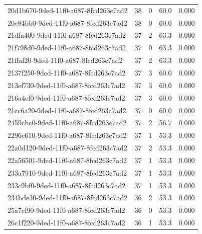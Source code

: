 \begin{longtable}{l r r r r}
20d1b670-9ded-11f0-a687-8fcd263c7ad2 & 38 & 0 & 60.0 & 0.000 \\

20e84bb0-9ded-11f0-a687-8fcd263c7ad2 & 38 & 0 & 60.0 & 0.000 \\

21dfa400-9ded-11f0-a687-8fcd263c7ad2 & 37 & 2 & 63.3 & 0.000 \\

21f798d0-9ded-11f0-a687-8fcd263c7ad2 & 37 & 0 & 63.3 & 0.000 \\

21ffaf20-9ded-11f0-a687-8fcd263c7ad2 & 37 & 2 & 63.3 & 0.000 \\

2137f250-9ded-11f0-a687-8fcd263c7ad2 & 37 & 3 & 60.0 & 0.000 \\

213ef730-9ded-11f0-a687-8fcd263c7ad2 & 37 & 3 & 60.0 & 0.000 \\

216a4cf0-9ded-11f0-a687-8fcd263c7ad2 & 37 & 3 & 60.0 & 0.000 \\

21cc6a20-9ded-11f0-a687-8fcd263c7ad2 & 37 & 0 & 60.0 & 0.000 \\

2459cbc0-9ded-11f0-a687-8fcd263c7ad2 & 37 & 2 & 56.7 & 0.000 \\

2296e610-9ded-11f0-a687-8fcd263c7ad2 & 37 & 1 & 53.3 & 0.000 \\

22a0d120-9ded-11f0-a687-8fcd263c7ad2 & 37 & 2 & 53.3 & 0.000 \\

22a56501-9ded-11f0-a687-8fcd263c7ad2 & 37 & 1 & 53.3 & 0.000 \\

233a7910-9ded-11f0-a687-8fcd263c7ad2 & 37 & 1 & 53.3 & 0.000 \\

233c9bf0-9ded-11f0-a687-8fcd263c7ad2 & 37 & 1 & 53.3 & 0.000 \\

234bde30-9ded-11f0-a687-8fcd263c7ad2 & 36 & 2 & 53.3 & 0.000 \\

25a7cf90-9ded-11f0-a687-8fcd263c7ad2 & 36 & 0 & 53.3 & 0.000 \\

26c1f220-9ded-11f0-a687-8fcd263c7ad2 & 36 & 1 & 53.3 & 0.000 \\


\end{longtable}
